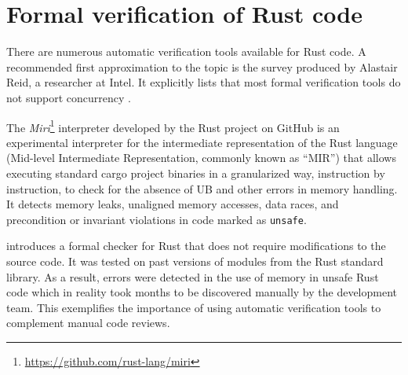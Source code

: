 \section{Formal verification of Rust code}

There are numerous automatic verification tools available for Rust code.
A recommended first approximation to the topic is
the survey produced by Alastair Reid, a researcher at Intel.
It explicitly lists that most formal verification tools
do not support concurrency \cite{reid2021}.

The \emph{Miri}\footnote{\url{https://github.com/rust-lang/miri}} interpreter
developed by the Rust project on GitHub is an experimental interpreter
for the intermediate representation of the Rust language
(Mid-level Intermediate Representation, commonly known as ``\acrshort{MIR}'')
that allows executing standard cargo project binaries
in a granularized way, instruction by instruction,
to check for the absence of \acrfull{UB}
and other errors in memory handling.
It detects memory leaks, unaligned memory accesses, data races,
and precondition or invariant violations in code marked as \texttt{unsafe}.

\cite{toman2015crust} introduces a formal checker for Rust
that does not require modifications to the source code.
It was tested on past versions of modules from the Rust standard library.
As a result, errors were detected in the use of memory in unsafe Rust code
which in reality took months to be discovered manually by the development team.
This exemplifies the importance of using automatic verification tools
to complement manual code reviews.